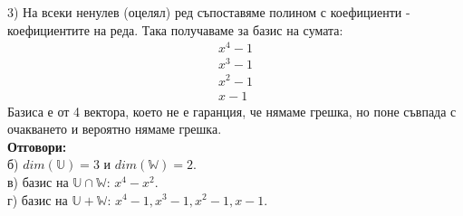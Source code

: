 \documentclass[a4paper, 12pt, oneside]{article}
\begin{document}
3) На всеки ненулев (оцелял) ред съпоставяме полином с коефициенти - коефициентите на реда.
Така получаваме за базис на сумата:
\begin{align*}
    x^4 - 1 \\
    x^3 - 1 \\
    x^2 - 1 \\
    x - 1
\end{align*}
Базиса е от 4 вектора, което не е гаранция, че нямаме грешка, но поне съвпада с очакването и вероятно нямаме грешка. \\
\textbf{Отговори:}\\
б) \(dim(\mathbb{U}) = 3\) и \(dim(\mathbb{W}) = 2\). \\
в) базис на \(\mathbb{U} \cap \mathbb{W}\): \(x^4 - x^2\). \\
г) базис на \(\mathbb{U} + \mathbb{W}\): \(x^4 - 1, x^3 - 1, x^2 - 1, x - 1\).
\end{document}
